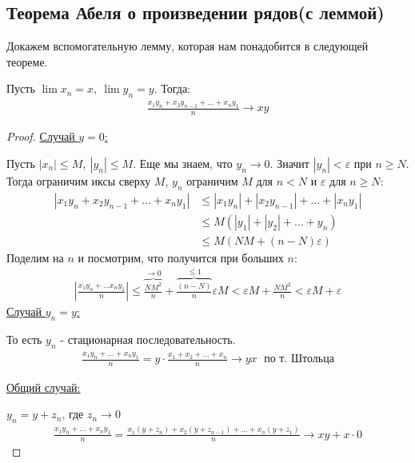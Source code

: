 \subsection{Теорема Абеля о произведении рядов(с леммой)}
Докажем вспомогательную лемму, которая нам понадобится в следующей теореме.
\begin{lemma}
    Пусть $\lim x_n = x,\ \lim y_n = y$. Тогда:
    \begin{gather*}
        \frac{x_1 y_n + x_2y_{n-1} + \ldots + x_ny_1}{n} \to xy
    \end{gather*}
\end{lemma}
\begin{proof} \quad 

    \underline{Случай $y = 0$:}

    Пусть $|x_n| \leq M,\ |y_n| \leq M$. Еще мы знаем, что $y_n \to 0$. Значит $|y_n| < \varepsilon$ при $n \geq N$.
    Тогда ограничим иксы сверху $M$, $y_n$ ограничим $M$ для $n < N$ и $\varepsilon$ для $n \geqslant N$:
    \begin{align*}
        |x_1y_n + x_2y_{n-1} + \ldots + x_ny_1| &\leqslant |x_1y_n| + |x_2y_{n-1}| + \ldots + |x_ny_1| \\
        &\leqslant M(|y_1|+|y_2|+\ldots + y_n) \\
        &\leqslant M(NM + (n-N)\varepsilon)
    \end{align*}
    Поделим на $n$ и посмотрим, что получится при больших $n$:
    \begin{gather*}
        \left|\frac{x_1y_n+\ldots x_ny_1}{n}\right|
        \leqslant \overbrace{\frac{NM^2}{n}}^{\to 0} +  \overbrace{\frac{(n-N)}{n}}^{\leq 1}\varepsilon M 
        < \varepsilon M + \frac{NM^2}{n}
        < \varepsilon M + \varepsilon
    \end{gather*}
    \underline{Случай $y_n = y$:} 
    
    То есть $y_n$ - стационарная последовательность.
    \begin{gather*}
        \frac{x_1y_n + \ldots + x_ny_1}{n} = y \cdot \frac{x_1+x_2+\ldots+x_n}{n} \longrightarrow yx \; \text{ по т. Штольца}
    \end{gather*}

    \underline{Общий случай:} 
    
    $y_n = y+z_n$, где $z_n \longrightarrow 0$
    \begin{gather*}
        \frac{x_1y_n + \ldots + x_ny_1}{n} = \frac{x_1(y+z_n) + x_2(y+z_{n-1}) + \ldots + x_n(y+z_1)}{n} \longrightarrow xy + x\cdot 0
    \end{gather*}
\end{proof}
